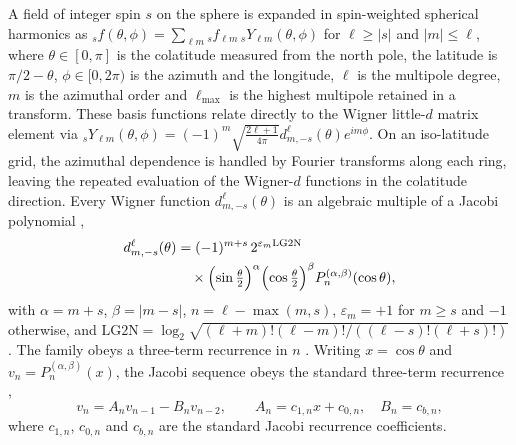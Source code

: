 \documentclass[letters,usenatbib,useAMS]{mnras}
\begin{document}
A field of integer spin $s$ on the sphere is expanded in spin-weighted spherical harmonics as
${}_s f(\theta,\phi)=\sum_{\ell m}{}_s f_{\ell m}\,{}_sY_{\ell m}(\theta,\phi)$ for $\ell \ge |s|$ and $|m| \le \ell$, where $\theta\in[0,\pi]$ is the colatitude measured from the north pole, the latitude is $\pi/2-\theta$, $\phi\in[0,2\pi)$ is the azimuth and the longitude, $\ell$ is the multipole degree, $m$ is the azimuthal order and $\ell_{\max}$ is the highest multipole retained in a transform. These basis functions relate directly to the Wigner little-$d$ matrix element via ${}_s Y_{\ell m}(\theta, \phi) = (-1)^m \sqrt{\frac{2\ell + 1}{4\pi}} d^\ell_{m, -s}(\theta) e^{im\phi}$. On an iso-latitude grid, the azimuthal dependence is handled by Fourier transforms along each ring, leaving the repeated evaluation of the Wigner-$d$ functions in the colatitude direction. Every Wigner function $d^\ell_{m,-s}(\theta)$ is an algebraic multiple of a Jacobi polynomial \citep[NIST DLMF 14.9.16, 18.3]{olver2010},
\begin{equation}
\begin{split}
  d^\ell_{m,-s}(\theta)
  &= (-1)^{m+s}\,2^{\varepsilon_m\mathrm{LG2N}}\\
  &\quad\times
    \Bigl(\sin\tfrac{\theta}{2}\Bigr)^\alpha
    \Bigl(\cos\tfrac{\theta}{2}\Bigr)^\beta
    P_n^{(\alpha,\beta)}(\cos\theta),
\end{split}
\end{equation}
with $\alpha=m+s$, $\beta=\lvert m-s\rvert$, $n=\ell-\max(m,s)$,
$\varepsilon_m=+1$ for $m\ge s$ and $-1$ otherwise, and
$\mathrm{LG2N}=\log_2\sqrt{(\ell+m)!(\ell-m)!/((\ell-s)!(\ell+s)!)}$. The family obeys a three-term recurrence in $n$ \citep[DLMF 18.9.1]{olver2010}. Writing $x=\cos\theta$ and $v_n=P_n^{(\alpha,\beta)}(x)$, the Jacobi sequence obeys the standard three-term recurrence \citep[DLMF 18.9.2]{olver2010},
\begin{equation}
\label{eq:jacobi}
v_n=A_n v_{n-1}-B_n v_{n-2},
\qquad
A_n=c_{1,n}x+c_{0,n},
\quad
B_n=c_{b,n},
\end{equation}
where $c_{1,n}$, $c_{0,n}$ and $c_{b,n}$ are the standard Jacobi recurrence coefficients.
\end{document}
